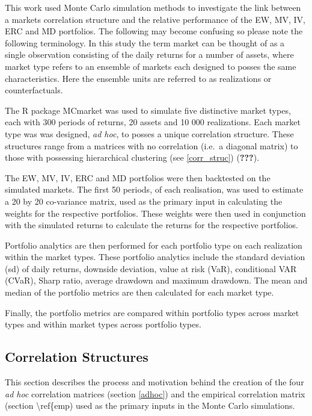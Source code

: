 \documentclass[11pt,preprint, authoryear]{elsarticle}
\numberwithin{equation}{section}
\numberwithin{figure}{section}
\numberwithin{table}{section}
\begin{document}
This work used Monte Carlo simulation methods to investigate the link
between a markets correlation structure and the relative performance of
the EW, MV, IV, ERC and MD portfolios. The following may become
confusing so please note the following terminology. In this study the
term market can be thought of as a single observation consisting of the
daily returns for a number of assets, where market type refers to an
ensemble of markets each designed to posses the same characteristics.
Here the ensemble units are referred to as realizations or
counterfactuals.

The R package MCmarket was used to simulate five distinctive market
types, each with 300 periods of returns, 20 assets and 10 000
realizations. Each market type was was designed, \emph{ad hoc}, to
posses a unique correlation structure. These structures range from a
matrices with no correlation (i.e.~a diagonal matrix) to those with
possessing hierarchical clustering (see \ref{corr_struc})
({\textbf{???}}).

The EW, MV, IV, ERC and MD portfolios were then backtested on the
simulated markets. The first 50 periods, of each realisation, was used
to estimate a 20 by 20 co-variance matrix, used as the primary input in
calculating the weights for the respective portfolios. These weights
were then used in conjunction with the simulated returns to calculate
the returns for the respective portfolios.

Portfolio analytics are then performed for each portfolio type on each
realization within the market types. These portfolio analytics include
the standard deviation (sd) of daily returns, downside deviation, value
at risk (VaR), conditional VAR (CVaR), Sharp ratio, average drawdown and
maximum drawdown. The mean and median of the portfolio metrics are then
calculated for each market type.

Finally, the portfolio metrics are compared within portfolio types
across market types and within market types across portfolio types.

\hypertarget{correlation-structures}{%
\subsection{\texorpdfstring{Correlation Structures
\label{corr_struc}}{Correlation Structures }}\label{correlation-structures}}

This section describes the process and motivation behind the creation of
the four \emph{ad hoc} correlation matrices (section \ref{adhoc}) and
the empirical correlation matrix (section \textbackslash ref\{emp) used
as the primary inputs in the Monte Carlo simulations.
\end{document}
